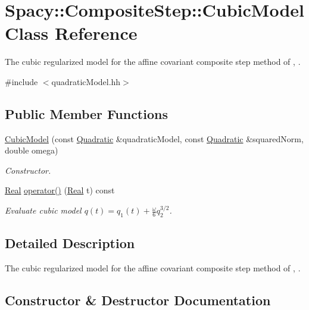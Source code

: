 \hypertarget{classSpacy_1_1CompositeStep_1_1CubicModel}{}\section{Spacy\+:\+:Composite\+Step\+:\+:Cubic\+Model Class Reference}
\label{classSpacy_1_1CompositeStep_1_1CubicModel}


The cubic regularized model for the affine covariant composite step method of \cite{Lubkoll2015}, \cite{Lubkoll2015a}.  




{\ttfamily \#include $<$quadratic\+Model.\+hh$>$}

\subsection*{Public Member Functions}
\begin{DoxyCompactItemize}
\item 
\hyperlink{classSpacy_1_1CompositeStep_1_1CubicModel_a81bcf7731badd9c540acf9c4ee07b67b}{Cubic\+Model} (const \hyperlink{classSpacy_1_1Quadratic}{Quadratic} \&quadratic\+Model, const \hyperlink{classSpacy_1_1Quadratic}{Quadratic} \&squared\+Norm, double omega)
\begin{DoxyCompactList}\small\item\em Constructor. \end{DoxyCompactList}\item 
\hyperlink{classSpacy_1_1Real}{Real} \hyperlink{classSpacy_1_1CompositeStep_1_1CubicModel_a5669f387117cfdc47b5be45a29f387ce}{operator()} (\hyperlink{classSpacy_1_1Real}{Real} t) const 
\begin{DoxyCompactList}\small\item\em Evaluate cubic model $ q(t) = q_1(t) + \frac{\omega}{6}q_2^{3/2} $. \end{DoxyCompactList}\end{DoxyCompactItemize}


\subsection{Detailed Description}
The cubic regularized model for the affine covariant composite step method of \cite{Lubkoll2015}, \cite{Lubkoll2015a}. 

\subsection{Constructor \& Destructor Documentation}
